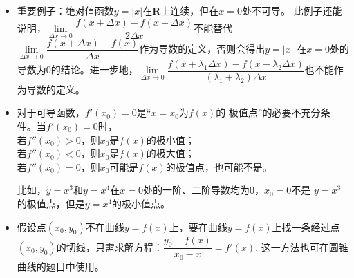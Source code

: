 \begin{itemize}[leftmargin=\inteval{\myitemleftmargin}pt,itemsep=
   \inteval{\myitemitempsep}pt,topsep=\inteval{\myitemtopsep}pt]
根据均值不等式，
\begin{align*}
    \left( 1+\dfrac{1}{n}\right)^n=1\cdot \left( 1+\dfrac{1}{n}\right)^n 
    <\left[\dfrac{1+n\left(1+\frac{1}{n}\right)}{n+1} \right]^{n+1}
    =\left( 1+\dfrac{1}{n+1}\right)^{n+1}
\end{align*}
说明数列$ \left\{ \left( 1+\dfrac{1}{n}\right)^n \right\}  $是单调递增且有上界的。

$ x\neq 0 $时，
$ 1+x<\e^x $，令$ x=\dfrac{1}{n} $，则$ 1+\dfrac{1}{n}<\e^{1/n} $，
所以$\left( 1+\dfrac{1}{n}\right)^n<\e $.

$ 1-x<\e^{-x} $，令$ x=\dfrac{1}{n+1} $，则$ 1-\dfrac{1}{n+1}=\dfrac{n}{n+1}<\e^{-1/(n+1)},
\dfrac{n+1}{n}>\e^{1/(n+1)} $，所以$ \e < \left( 1+\dfrac{1}{n}\right)^{n+1} $.
于是：
\begin{align}\label{e的两边夹不等式}
    \left( 1+\dfrac{1}{n}\right)^{n} < \e < \left( 1+\dfrac{1}{n}\right)^{n+1}
\end{align}
同时取对数后可得：
\begin{align*}
    \dfrac{1}{n+1} < \ln \dfrac{n+1}{n}=\dfrac{\ln (n+1)-\ln n}{(n+1)-n} < \dfrac{1}{n}
\end{align*}
这个不等式相当于在区间$ [n,n+1] $上对$ \ln x $应用拉格朗日中值定理。

\item 重要例子：绝对值函数$ y=|x| $在\textbf{R}上连续，但在$ x=0 $处不可导。
此例子还能说明，$ \lim\limits_{\Delta x\to 0}\dfrac{f(x+\Delta x)-
f(x-\Delta x)}{2\Delta x} $不能替代$ \lim\limits_{\Delta x\to 0}
\dfrac{f(x+\Delta x)-f(x)}{\Delta x} $作为导数的定义，否则会得出$ y=|x| $
在$ x=0 $处的导数为0的结论。进一步地，$ \lim\limits_{\Delta x\to 0}
\dfrac{f(x+\lambda_1\Delta x)-f(x-\lambda_2\Delta x)}{(\lambda_1+
    \lambda_2)\Delta x} $也不能作为导数的定义。

\item 对于可导函数，$ f'(x_0)=0 $是“$ x=x_0 $为$ f(x) $的
极值点”的必要不充分条件。当$ f'(x_0)=0 $时，\\
 若$ f''(x_0)>0 $，则$ x_0 $是$ f(x) $的极小值；\\
 若$ f''(x_0)<0 $，则$ x_0 $是$ f(x) $的极大值；\\
 若$ f''(x_0)=0 $，则$ x_0 $可能是$ f(x) $的极值点，也可能不是。

比如，$ y=x^3 $和$ y=x^4 $在$ x=0 $处的一阶、二阶导数均为0，$ x_0=0 $不是
$ y=x^3 $的极值点，但是$ y=x^4 $的极小值点。

\item  假设点$ (x_0,y_0) $不在曲线$ y=f(x) $上，要在曲线$ y=f(x) $上找一条经过点$ (x_0,y_0) $的切线，只需求解方程：$ \dfrac{y_0-f(x)}{x_0-x}=f'(x) $. 这一方法也可在圆锥曲线的题目中使用。


\end{itemize}
